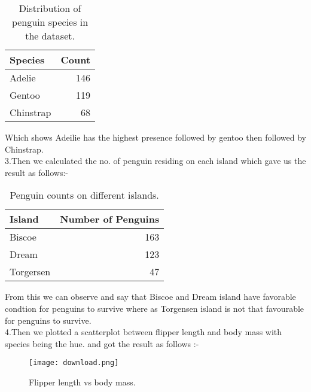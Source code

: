 \documentclass[12pt]{article}
\begin{document}
\begin{table}[h!]
    \centering
    \begin{tabular}{lr}
        \toprule
        \textbf{Species} & \textbf{Count} \\
        \midrule
        Adelie  & 146 \\
        Gentoo  & 119 \\
        Chinstrap & 68 \\
        \bottomrule
    \end{tabular}
    \caption{Distribution of penguin species in the dataset.}
    \label{tab:species-distribution}
\end{table}
Which shows Adeilie has the highest presence followed by gentoo then followed by Chinstrap.\\
3.Then we calculated the no. of penguin residing on each island which gave us the result as follows:-\\
\begin{table}[h]
    \centering
    \begin{tabular}{lr}
        \toprule
        \textbf{Island} & \textbf{Number of Penguins} \\
        \midrule
        Biscoe & 163 \\
        Dream & 123 \\
        Torgersen & 47 \\
        \bottomrule
    \end{tabular}
    \caption{Penguin counts on different islands.}
    \label{tab:penguin_counts}
\end{table}
    From this we can observe and say that Biscoe and Dream island have favorable condtion for penguins to survive where as Torgensen island is not that favourable for penguins to survive. 
\\

4.Then we plotted a scatterplot between flipper length and body mass with species being the hue. and got the result as follows :-\\
\begin{figure}[H]
    \centering
    \texttt{[image: download.png]} 
    \caption{Flipper length vs body mass.}
    \label{fig:example-image}
\end{figure}\\
\end{document}
